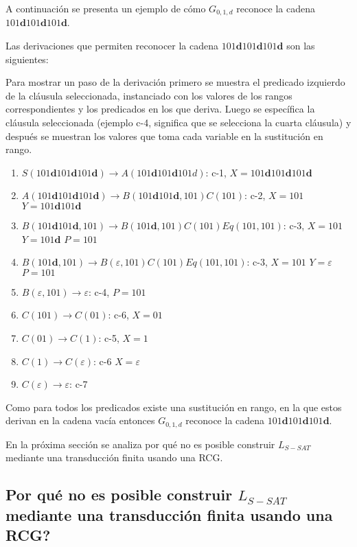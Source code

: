 \documentclass[12pt]{article}
\begin{document}
A continuación se presenta un ejemplo de cómo $G_{0,1,d}$ reconoce la cadena $101\mathbf{d}101\mathbf{d}101\mathbf{d}$.

Las derivaciones que permiten reconocer la cadena $101\mathbf{d}101\mathbf{d}101\mathbf{d}$ son las siguientes:

Para mostrar un paso de la derivación primero se muestra el predicado izquierdo de la cláusula seleccionada, instanciado con los valores de los rangos correspondientes y los predicados en los que deriva. Luego se específica la cláusula seleccionada (ejemplo c-4, significa que se selecciona la cuarta cláusula) y después se muestran los valores que toma cada variable en la sustitución en rango.

\begin{enumerate}
    \item $S(101\mathbf{d}101\mathbf{d}101\mathbf{d}) \to A(101\mathbf{d}101\mathbf{d}101d)$: c-1, $X=101\mathbf{d}101\mathbf{d}101\mathbf{d}$
    \item $A(101\mathbf{d}101\mathbf{d}101\mathbf{d}) \to B(101\mathbf{d}101\mathbf{d},101)C(101)$: c-2, $X=101$ $Y=101\mathbf{d}101\mathbf{d}$
    \item $B(101\mathbf{d}101\mathbf{d},101) \to B(101\mathbf{d},101)C(101)Eq(101,101)$: c-3, $X=101$ $Y=101\mathbf{d}$ $P=101$
    \item $B(101\mathbf{d},101) \to B(\varepsilon,101)C(101)Eq(101,101)$: c-3, $X=101$ $Y=\varepsilon$ $P=101$
    \item $B(\varepsilon,101) \to \varepsilon$: c-4, $P=101$
    \item $C(101)\to C(01)$: c-6, $X=01$
    \item $C(01)\to C(1)$: c-5, $X=1$
    \item $C(1)\to C(\varepsilon)$: c-6 $X=\varepsilon$
    \item $C(\varepsilon)\to \varepsilon$: c-7
\end{enumerate}

Como para todos los predicados existe una sustitución en rango, en la que estos derivan en la cadena vacía entonces  $G_{0,1,d}$ reconoce la cadena $101\mathbf{d}101\mathbf{d}101\mathbf{d}$. 

En la próxima sección se analiza por qué no es posible construir $L_{S-SAT}$ mediante una transducción finita usando
una RCG.

\subsection{Por qué no es posible construir $L_{S-SAT}$ mediante una transducción finita usando una RCG?}
\end{document}
